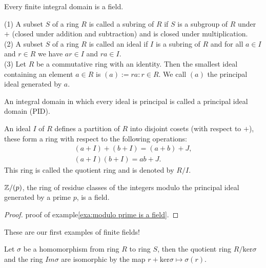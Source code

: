 \begin{proposition}{}{}
    Every finite integral domain is a field.
\end{proposition}

\begin{definition}{}{}
    (1) A subset $S$ of a ring $R$ is called a subring of $R$ if
     $S$ is a subgroup of $R$ under $+$ (closed under addition and subtraction) and
        is closed under multiplication. \\
    (2) A subset $S$ of a ring $R$ is called an ideal if 
        $I$ is a subring of $R$ and for all $a \in I$ and $r \in R$
        we have $ar \in I$ and $ra \in I$.\\
    (3) Let $R$ be a commutative ring with an identity. 
        Then the smallest ideal containing an element
        $a \in R$ is $(a) := {ra : r \in R}$. We call $(a)$ the principal ideal generated by $a$.
\end{definition}

\begin{definition}{}{}
    An integral domain in which every ideal is principal is called a principal ideal domain (PID).
\end{definition}

An ideal $I$ of $R$ defines a partition of $R$ into disjoint cosets (with respect to $+$),
these form a ring with respect to the following operations:
\begin{align*}
    (a+I)+(b+I)=(a+b)+J,\\
    (a+I)(b+I)=ab+J.
\end{align*}
This ring is called the quotient ring and is denoted by $R/I$.

\begin{proposition}{}{}
    $\mathbb{Z}/(p)$, the ring of residue classes of the integers modulo the principal ideal generated by a prime $p$,
    is a field.
\end{proposition}
\begin{proof}
    proof of example\ref{exa:modulo prime is a field}.
\end{proof}

These are our first examples of finite fields!

\begin{theorem}{}{}
    Let $\sigma$ be a homomorphism from ring $R$ to ring $S$, then 
    the quotient ring $R/\text{ker}\sigma$ and the ring $Im\sigma$ 
    are isomorphic by the map $r+\text{ker}\sigma\mapsto \sigma(r)$.
\end{theorem}

